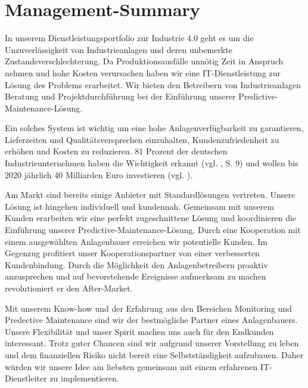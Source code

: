 \section{Management-Summary}

In unserem Dienstleistungsportfolio zur Industrie 4.0 geht es um die Unzuverlässigkeit von Industrieanlagen und deren unbemerkte Zustandsverschlechterung. Da Produktionsausfälle unnötig Zeit in Anspruch nehmen und hohe Kosten verursachen haben wir eine IT-Dienstleistung zur Lösung des Problems erarbeitet. Wir bieten den Betreibern von Industrieanlagen Beratung und Projektdurchführung bei der Einführung unserer Predictive-Maintenance-Lösung.

Ein solches System ist wichtig um eine hohe Anlagenverfügbarkeit zu garantieren, Lieferzeiten und Qualitätsversprechen einzuhalten, Kundenzufriedenheit zu erhöhen und Kosten zu reduzieren. 81 Prozent der deutschen Industrieunternehmen haben die Wichtigkeit erkannt (vgl. \cite{SasForsa}, S. 9) und wollen bis 2020 jährlich 40 Milliarden Euro investieren (vgl. \cite{IndustrieHohesPotenzial}).

Am Markt sind bereits einige Anbieter mit Standardlösungen vertreten. Unsere Lösung ist hingehen individuell und kundennah. Gemeinsam mit unserem Kunden erarbeiten wir eine perfekt zugeschnittene Lösung und koordinieren die Einführung unserer Predictive-Maintenance-Lösung. Durch eine Kooperation mit einem ausgewählten Anlagenbauer erreichen wir potentielle Kunden. Im Gegenzug profitiert unser Kooperationspartner von einer verbesserten Kundenbindung. Durch die Möglichkeit den Anlagenbetreibern proaktiv anzusprechen und auf bevorstehende Ereignisse aufmerksam zu machen revolutioniert er den After-Market.

Mit unserem Know-how und der Erfahrung aus den Bereichen Monitoring und Predective Maintenance sind wir der bestmögliche Partner eines Anlagenbauers. Unsere Flexibilität und unser Spirit machen uns auch für den Endkunden interessant. Trotz guter Chancen sind wir aufgrund unserer Vorstellung zu leben und dem finanziellen Risiko nicht bereit eine Selbstständigkeit aufzubauen. Daher würden wir unsere Idee am liebsten gemeinsam mit einem erfahrenen IT-Dienstleiter zu implementieren.

\newpage